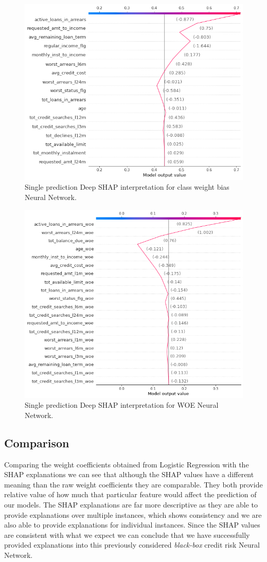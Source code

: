 \begin  {figure}[!htpb]
\centering
  \includegraphics[width=0.8\linewidth]{Credit_Images/shap-nn-weighted-single.png}
   \caption{Single prediction Deep SHAP interpretation for class weight bias Neural Network.}
    \label{fig-deep-shap-weighted-single-NN}
\end{figure}

\begin  {figure}[!htpb]
\centering
  \includegraphics[width=0.8\linewidth]{Credit_Images/WOE_IV_NOSCALE_INDV.png}
   \caption{Single prediction Deep SHAP interpretation for WOE Neural Network.}
    \label{fig-deep-shap-WOE-single-NN}
\end{figure}


\subsection{Comparison} Comparing the weight coefficients obtained from Logistic Regression with the SHAP explanations we can see that although the SHAP values have a different meaning than the raw weight coefficients they are comparable. They both provide relative value of how much that particular feature would affect the prediction of our models. The SHAP explanations are far more descriptive as they are able to provide explanations over multiple instances, which shows consistency and we are also able to provide explanations for individual instances. Since the SHAP values are consistent with what we expect we can conclude that we have successfully provided explanations into this previously considered \emph{black-box} credit risk Neural Network.

